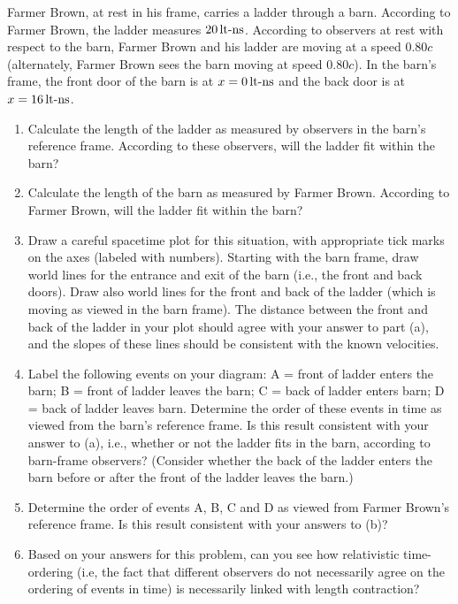 \begin{problem}
Farmer Brown, at rest in his frame, carries a ladder through
a barn.  According to Farmer Brown, the ladder measures
$20\,\mbox{lt-ns}$.  According to observers at rest with respect
to the barn, Farmer Brown and his ladder are moving at a
speed $0.80c$ (alternately, Farmer Brown sees the barn 
moving at speed $0.80c$).  In the barn's frame, the
front door of the barn is at $x = 0 \,\mbox{lt-ns}$ and the back 
door is at $x = 16\,\mbox{lt-ns}$.
\begin{enumerate}
\item Calculate the length of the ladder as measured by
observers in the barn's reference frame.  According to
these observers, will the ladder fit within the barn?
\item Calculate the length of the barn as measured by
Farmer Brown.  According to Farmer Brown, will the ladder
fit within the barn?
\item Draw a careful spacetime plot for this situation,
with appropriate tick marks on the axes (labeled with
numbers).  Starting with the barn frame, draw world
lines for the entrance and exit of the barn (i.e., the
front and back doors).  Draw also world lines for the front and
back of the ladder (which is moving as viewed in the
barn frame).  The distance between the front and back of
the ladder in your plot should agree with your answer
to part (a), and the slopes of these lines should be
consistent with the known velocities.
\item Label the following events on your diagram:
A = front of ladder enters the barn; B = front of ladder
leaves the barn; C = back of ladder enters barn;
D = back of ladder leaves barn.  Determine the order
of these events in time as viewed from the barn's
reference frame.  Is this result consistent with your
answer to (a), i.e., whether or not the ladder fits in the
barn, according to barn-frame observers?  (Consider
whether the back of the ladder enters the barn before
or after the front of the ladder leaves the barn.)
\item Determine the order of events A, B, C and D as
viewed from Farmer Brown's reference frame.  Is this
result consistent with your answers to (b)?
\item Based on your answers for this problem, can you
see how relativistic time-ordering (i.e, the fact that
different observers do not necessarily agree on the
ordering of events in time) is necessarily linked with
length contraction?
\end{enumerate}
\label{prob:farmer}
\end{problem}

